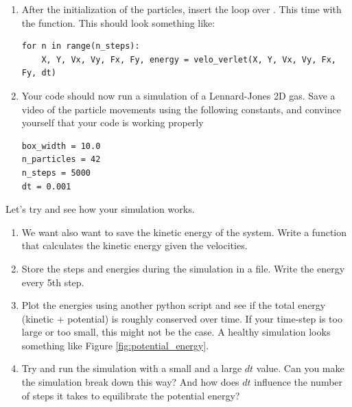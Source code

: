 \documentclass{article}
\begin{document}
\begin{enumerate}[resume]

    \item After the initialization of the particles, insert the loop over .
        This time with the  function.
        This should look something like:

\begin{lstlisting}
for n in range(n_steps):
    X, Y, Vx, Vy, Fx, Fy, energy = velo_verlet(X, Y, Vx, Vy, Fx, Fy, dt)
\end{lstlisting}

    \item Your code should now run a simulation of a Lennard-Jones 2D gas.
        Save a video of the particle movements using the following constants, and convince yourself that your code is working properly

\begin{lstlisting}
box_width = 10.0
n_particles = 42
n_steps = 5000
dt = 0.001
\end{lstlisting}

\end{enumerate}


\newpage

Let's try and see how your simulation works.

\begin{enumerate}[resume]

    \item We want also want to save the kinetic energy of the system. Write a function that calculates the kinetic energy given the velocities.

    \item Store the steps and energies during the simulation in a file. Write the energy every 5th step.

    \item Plot the energies using another python script and see if the total energy (kinetic + potential) is roughly conserved over time.
        If your time-step is too large or too small, this might not be the case.
        A healthy simulation looks something like Figure \ref{fig:potential_energy}.

    \item Try and run the simulation with a small and a large $dt$ value. 
        Can you make the simulation break down this way?
        And how does $dt$ influence the number of steps it takes to equilibrate the potential energy?

\end{enumerate}
\end{document}
